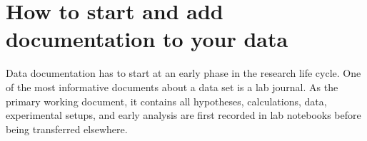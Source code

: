 \section{How to start and add documentation to your data}
Data documentation has to start at an early phase in the research life cycle. One of the most informative documents about a data set is a lab journal. As the primary working document, it contains all hypotheses, calculations, data, experimental setups, and early analysis are first recorded in lab notebooks before being transferred elsewhere.
\whiteline

